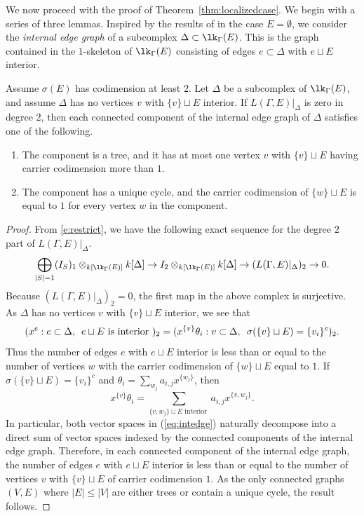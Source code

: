 We now proceed with the proof of Theorem~\ref{thm:localizedcase}. We begin with a series of three lemmas. Inspired by the results of \cite{dMGPSS20} in the case $E = \emptyset$, we consider the \emph{internal edge graph} of a subcomplex $\Delta \subset \lk_{\Gamma}(E)$. This is the graph contained in the $1$-skeleton of $\lk_{\Gamma}(E)$ consisting of edges $e \subset \Delta$ with $e \sqcup E$ interior. 

\begin{lemma}\label{lem:intedge}
Assume $\sigma(E)$ has codimension at least $2$. Let $\Delta$ be a subcomplex of $\lk_{\Gamma}(E)$, and assume $\Delta$ has no vertices $v$ with $\{v\} \sqcup E$ interior. If $L(\Gamma, E)|_{\Delta}$ is zero in degree $2$, then each connected component of the internal edge graph of $\Delta$ satisfies one of the following.
\begin{enumerate}
\item The component is a tree, and it has at most one  vertex $v$ with $\{v\} \sqcup E$ having carrier codimension more than $1$. 
\item The component has a unique cycle, and the carrier codimension of $\{w\} \sqcup E$ is equal to $1$ for every vertex $w$ in the component. 
\end{enumerate}
\end{lemma}

\begin{proof}
From \eqref{e:restrict}, we have the following exact sequence for the degree $2$ part of $L(\Gamma, E)|_{\Delta}$.
$$ \bigoplus_{\vert S \vert = 1} (I_S)_1\otimes_{k[\lk_{\Gamma}(E)]} k[\Delta]  \to I_2\otimes_{k[\lk_{\Gamma}(E)]} k[\Delta] \to (L(\Gamma, E)|_{\Delta})_2 \to 0.$$
Because $(L(\Gamma, E)|_{\Delta})_2 = 0$, the first map in the above complex is surjective.  As $\Delta$ has no vertices $v$ with $\{v\} \sqcup E$ interior, we see that
\begin{equation}\label{eq:intedge}
(x^{e}: e \subset \Delta, \enskip e \sqcup E \text{ is interior })_2 = (x^{\{v\}} \theta_{i}: v \subset \Delta, \enskip \sigma(\{v\} \sqcup E) = \{v_i\}^c)_2.
\end{equation}
Thus the number of edges $e$ with $e \sqcup E$ interior is less than or equal to the number of vertices $w$ with the carrier codimension of $\{w\} \sqcup E$ equal to $1$. If $\sigma(\{v\} \sqcup E) = \{v_i\}^c$ and $\theta_{i} = \sum_{w_j} a_{i,j}x^{\{w_j\}}$, then 
$$x^{\{v\}} \theta_{i} = \sum_{\{v, w_j\} \sqcup E \text{ interior }} a_{i,j}x^{\{v, w_j\}}.$$ In particular, both vector spaces in (\ref{eq:intedge}) naturally decompose into a direct sum of vector spaces indexed by the connected components of the internal edge graph. Therefore, in each connected component of the internal edge graph, the number of edges $e$ with $e \sqcup E$ interior is less than or equal to the number of vertices $v$ with $\{v\} \sqcup E$ of carrier codimension $1$. As the only connected graphs $(V, E)$ where $\vert E \vert \le \vert V \vert$ are either trees or contain a unique cycle, the result follows.
\end{proof}


